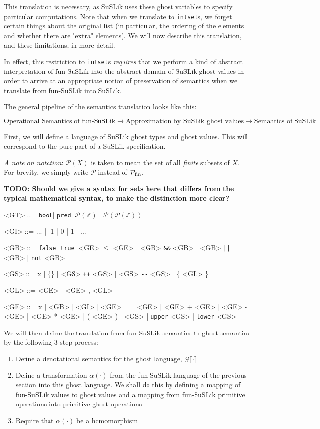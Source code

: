 \documentclass[10pt]{article}
\newcommand{\ttt}[1]{\texttt{#1}}
\newcommand{\ra}{\ensuremath{\rightarrow}}
\newcommand{\bool}{\ttt{bool}}
\newcommand{\pred}{\ttt{pred}}
\newcommand{\true}{\ttt{true}}
\newcommand{\false}{\ttt{false}}
\newcommand{\upperS}{\ttt{upper}}
\newcommand{\lowerS}{\ttt{lower}}
\newcommand{\sem} [1] {\llbracket#1\rrbracket}
\newcommand{\Gsem} [1] {\mathcal{G}\sem{#1}}
\newcommand{\PZ} {\mathcal{P}(\mathbb{Z})}
\newcommand{\PPZ} {\mathcal{P}(\PZ)}
\begin{document}
\noindent
This translation is necessary, as SuSLik uses these ghost variables to specify particular computations. Note that when we translate to
\verb|intset|s, we forget certain things about the original list (in particular, the ordering of the elements and whether there are "extra"
elements). We will now describe this translation, and these limitations, in more detail.

In effect, this restriction to \verb|intset|s \textit{requires} that we perform a kind of abstract interpretation of fun-SuSLik into the
abstract domain of SuSLik ghost values in order to arrive at an appropriate notion of preservation of semantics when we
translate from fun-SuSLik into SuSLik.


\noindent
The general pipeline of the semantics translation looks like this:

\[
  {\scriptstyle \text{Operational Semantics of fun-SuSLik} \ra \text{Approximation by SuSLik ghost values} \ra \text{Semantics of SuSLik}}
\]

First, we will define a language of SuSLik ghost types and ghost values. This will correspond to the pure part of a SuSLik specification.

\textit{A note on notation}: $\mathcal{P}(X)$ is taken to mean the set of all \textit{finite} subsets of $X$. For brevity, we simply write $\mathcal{P}$ instead of 
$\mathcal{P}_{\textnormal{fin}}$.

\textbf{TODO: Should we give a syntax for sets here that differs from the typical mathematical syntax, to make the distinction more clear?}
\\
\begin{grammar}
  <GT> ::= \bool | \pred | $\PZ$ | $\PPZ$

  <GI> ::= ... | -1 | 0 | 1 | ...

  <GB> ::= \false | \true | <GE> $\le$ <GE> | <GB> \ttt{\&\&} <GB> | <GB> \ttt{||} <GB> | \ttt{not}\; <GB>

  <GS> ::= x | \{\} | <GS> \ttt{++} <GS> | <GS> \ttt{-{}-} <GS> | \{ <GL> \}

  <GL> ::= <GE> | <GE> , <GL>

  <GE> ::= x | <GB> | <GI> | <GE> == <GE> | <GE> + <GE> | <GE> - <GE> | <GE> * <GE> | ( <GE> ) | <GS> | \upperS\; <GS> | \lowerS\; <GS>
\end{grammar}

We will then define the translation from fun-SuSLik semantics to ghost semantics by the following 3 step process:

\begin{enumerate}
  \item Define a denotational semantics for the ghost language, $\Gsem{\cdot}$
  \item Define a transformation $\alpha(\cdot)$ from the fun-SuSLik language of the previous section into this ghost language. We shall do this by defining a mapping of fun-SuSLik values to ghost values and a mapping from fun-SuSLik
primitive operations into primitive ghost operations
  \item Require that $\alpha(\cdot)$ be a homomorphism
\end{enumerate}
\end{document}
